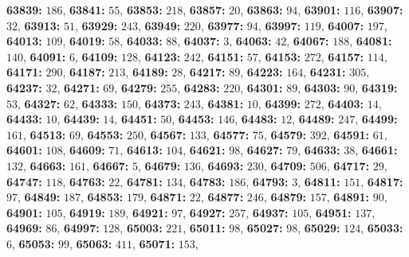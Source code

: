 \textsf{\bfseries 63839:} $186$, \textsf{\bfseries 63841:} $55$, \textsf{\bfseries 63853:} $218$, \textsf{\bfseries 63857:} $20$, \textsf{\bfseries 63863:} $94$, \textsf{\bfseries 63901:} $116$, \textsf{\bfseries 63907:} $32$, \textsf{\bfseries 63913:} $51$, \textsf{\bfseries 63929:} $243$, \textsf{\bfseries 63949:} $220$, \textsf{\bfseries 63977:} $94$, \textsf{\bfseries 63997:} $119$, \textsf{\bfseries 64007:} $197$, \textsf{\bfseries 64013:} $109$, \textsf{\bfseries 64019:} $58$, \textsf{\bfseries 64033:} $88$, \textsf{\bfseries 64037:} $3$, \textsf{\bfseries 64063:} $42$, \textsf{\bfseries 64067:} $188$, \textsf{\bfseries 64081:} $140$, \textsf{\bfseries 64091:} $6$, \textsf{\bfseries 64109:} $128$, \textsf{\bfseries 64123:} $242$, \textsf{\bfseries 64151:} $57$, \textsf{\bfseries 64153:} $272$, \textsf{\bfseries 64157:} $114$, \textsf{\bfseries 64171:} $290$, \textsf{\bfseries 64187:} $213$, \textsf{\bfseries 64189:} $28$, \textsf{\bfseries 64217:} $89$, \textsf{\bfseries 64223:} $164$, \textsf{\bfseries 64231:} $305$, \textsf{\bfseries 64237:} $32$, \textsf{\bfseries 64271:} $69$, \textsf{\bfseries 64279:} $255$, \textsf{\bfseries 64283:} $220$, \textsf{\bfseries 64301:} $89$, \textsf{\bfseries 64303:} $90$, \textsf{\bfseries 64319:} $53$, \textsf{\bfseries 64327:} $62$, \textsf{\bfseries 64333:} $150$, \textsf{\bfseries 64373:} $243$, \textsf{\bfseries 64381:} $10$, \textsf{\bfseries 64399:} $272$, \textsf{\bfseries 64403:} $14$, \textsf{\bfseries 64433:} $10$, \textsf{\bfseries 64439:} $14$, \textsf{\bfseries 64451:} $50$, \textsf{\bfseries 64453:} $146$, \textsf{\bfseries 64483:} $12$, \textsf{\bfseries 64489:} $247$, \textsf{\bfseries 64499:} $161$, \textsf{\bfseries 64513:} $69$, \textsf{\bfseries 64553:} $250$, \textsf{\bfseries 64567:} $133$, \textsf{\bfseries 64577:} $75$, \textsf{\bfseries 64579:} $392$, \textsf{\bfseries 64591:} $61$, \textsf{\bfseries 64601:} $108$, \textsf{\bfseries 64609:} $71$, \textsf{\bfseries 64613:} $104$, \textsf{\bfseries 64621:} $98$, \textsf{\bfseries 64627:} $79$, \textsf{\bfseries 64633:} $38$, \textsf{\bfseries 64661:} $132$, \textsf{\bfseries 64663:} $161$, \textsf{\bfseries 64667:} $5$, \textsf{\bfseries 64679:} $136$, \textsf{\bfseries 64693:} $230$, \textsf{\bfseries 64709:} $506$, \textsf{\bfseries 64717:} $29$, \textsf{\bfseries 64747:} $118$, \textsf{\bfseries 64763:} $22$, \textsf{\bfseries 64781:} $134$, \textsf{\bfseries 64783:} $186$, \textsf{\bfseries 64793:} $3$, \textsf{\bfseries 64811:} $151$, \textsf{\bfseries 64817:} $97$, \textsf{\bfseries 64849:} $187$, \textsf{\bfseries 64853:} $179$, \textsf{\bfseries 64871:} $22$, \textsf{\bfseries 64877:} $246$, \textsf{\bfseries 64879:} $157$, \textsf{\bfseries 64891:} $90$, \textsf{\bfseries 64901:} $105$, \textsf{\bfseries 64919:} $189$, \textsf{\bfseries 64921:} $97$, \textsf{\bfseries 64927:} $257$, \textsf{\bfseries 64937:} $105$, \textsf{\bfseries 64951:} $137$, \textsf{\bfseries 64969:} $86$, \textsf{\bfseries 64997:} $128$, \textsf{\bfseries 65003:} $221$, \textsf{\bfseries 65011:} $98$, \textsf{\bfseries 65027:} $98$, \textsf{\bfseries 65029:} $124$, \textsf{\bfseries 65033:} $6$, \textsf{\bfseries 65053:} $99$, \textsf{\bfseries 65063:} $411$, \textsf{\bfseries 65071:} $153$, 
